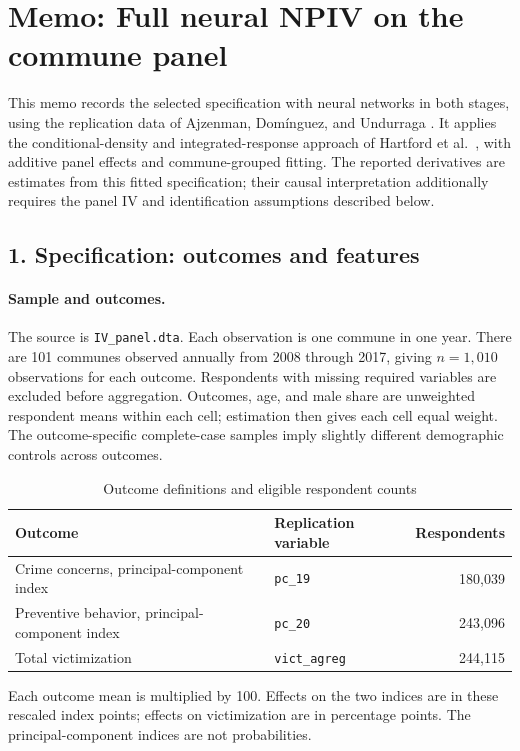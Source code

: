 \medskip
\section*{Memo: Full neural NPIV on the commune panel}
This memo records the selected specification with neural networks in both stages, using the replication data of Ajzenman, Dom\'{i}nguez, and Undurraga \cite{immigration}. It applies the conditional-density and integrated-response approach of Hartford et al.\ \cite{deepiv}, with additive panel effects and commune-grouped fitting. The reported derivatives are estimates from this fitted specification; their causal interpretation additionally requires the panel IV and identification assumptions described below.

\subsection*{1. Specification: outcomes and features}
\paragraph{Sample and outcomes.}
The source is \texttt{IV\_panel.dta}. Each observation is one commune in one year. There are 101 communes observed annually from 2008 through 2017, giving $n=1{,}010$ observations for each outcome. Respondents with missing required variables are excluded before aggregation. Outcomes, age, and male share are unweighted respondent means within each cell; estimation then gives each cell equal weight. The outcome-specific complete-case samples imply slightly different demographic controls across outcomes.
\begin{table}[H]
\centering
\caption{Outcome definitions and eligible respondent counts}
\label{tab:neural-outcomes}
\small
\begin{tabularx}{\linewidth}{@{}Xlr@{}}
\toprule
Outcome & Replication variable & Respondents\\
\midrule
Crime concerns, principal-component index & \texttt{pc\_19} & 180,039\\
Preventive behavior, principal-component index & \texttt{pc\_20} & 243,096\\
Total victimization & \texttt{vict\_agreg} & 244,115\\
\bottomrule
\end{tabularx}
\end{table}
Each outcome mean is multiplied by 100. Effects on the two indices are in these rescaled index points; effects on victimization are in percentage points. The principal-component indices are not probabilities.


